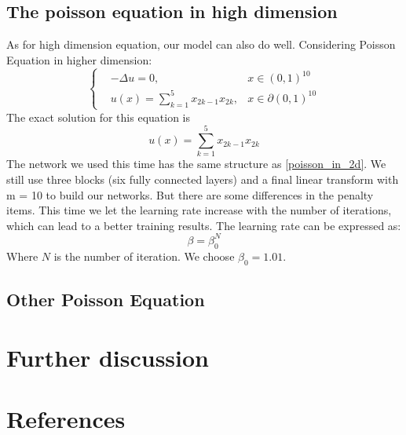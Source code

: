 \documentclass{article}
\begin{document}
\subsection{The poisson equation in high dimension}
As for high dimension equation, our model can also do well. Considering Poisson Equation in higher dimension:
\begin{equation}
\left \{
\begin{aligned}
&-\Delta u =0, &x\in (0,1)^{10} \\
&u(x)=\sum\limits_{k=1}^5x_{2k-1}x_{2k}, &x\in \partial (0,1)^{10}
\end{aligned}
\right.
\end{equation}
The exact solution for this equation is 
\begin{equation}
u(x)=\sum\limits_{k=1}^5x_{2k-1}x_{2k}
\end{equation}
The network we used this time has the same structure as \ref{poisson_in_2d}. We still use three blocks (six fully connected layers) and a final linear transform with m = 10 to build our networks. But there are some differences in the penalty items. This time we let the learning rate increase with the number of iterations, which can lead to a better training results. The learning rate can be expressed as:
\begin{equation}
\beta=\beta_{0}^N
\end{equation}
Where $N$ is the number of iteration. We choose $\beta_0=1.01$.

\subsection{Other Poisson Equation}


\section{Further discussion}

\section*{References}
\medskip

\small
\end{document}
